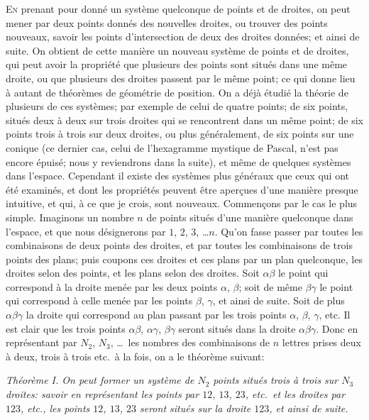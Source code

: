 \documentclass[12pt,a4paper]{article}
\theoremstyle{plain}
\begin{document}
\textsc{En} prenant pour donn\'e un syst\`eme quelconque de points et de droites, on peut mener par deux points donn\'es des nouvelles droites, ou trouver des points nouveaux, savoir les points d'intersection de deux des droites donn\'ees; et ainsi de suite. On obtient de cette mani\`ere un nouveau syst\`eme de points et de droites, qui peut avoir la propri\'et\'e que plusieurs des points sont situ\'es dans une m\^eme droite, ou que plusieurs des droites passent par le m\^eme point; ce qui donne lieu \`a autant de th\'eor\`emes de g\'eom\'etrie de position. On a d\'ej\`a \'etudi\'e la th\'eorie de plusieurs de ces syst\`emes; par exemple de celui de quatre points; de six points, situ\'es deux \`a deux sur trois droites qui se rencontrent dans un m\^eme point; de six points trois \`a trois sur deux droites, ou plus g\'en\'eralement, de six points sur une conique (ce dernier cas, celui de l'hexagramme mystique de Pascal, n'est pas encore \'epuis\'e; nous y reviendrons dans la suite), et m\^eme de quelques syst\`emes dans l'espace. Cependant il existe des syst\`emes plus g\'en\'eraux que ceux qui ont \'et\'e examin\'es, et dont les propri\'et\'es peuvent \^etre aper\c{c}ues d'une mani\`ere presque intuitive, et qui, \`a ce que je crois, sont nouveaux. Commen\c{c}ons par le cas le plus simple. Imaginons un nombre $n$ de points situ\'es d'une mani\`ere quelconque dans l'espace, et que nous d\'esignerons par $1$, $2$, $3$, \ldots $n$. Qu'on fasse passer par toutes les combinaisons de deux points des droites, et par toutes les combinaisons de trois points des plans; puis coupons ces droites et ces plans par un plan quelconque, les droites selon des points, et les plans selon des droites. Soit $\alpha\beta$ le point qui correspond \`a la droite men\'ee par les deux points $\alpha$, $\beta$; soit de m\^eme $\beta\gamma$ le point qui correspond \`a celle men\'ee par les points $\beta$, $\gamma$, et ainsi de suite. Soit de plus $\alpha\beta\gamma$ la droite qui correspond au plan passant par les trois points $\alpha$, $\beta$, $\gamma$, etc. Il est clair que les trois points $\alpha\beta$, $\alpha\gamma$, $\beta\gamma$ seront situ\'es dans la droite $\alpha\beta\gamma$. Donc en repr\'esentant par $N_2$, $N_3$, \ldots\ les nombres des combinaisons de $n$ lettres prises deux \`a deux, trois \`a trois etc.\ \`a la fois, on a le th\'eor\`eme suivant:

\smallskip
\textit{Th\'eor\`eme I. On peut former un syst\`eme de $N_2$ points situ\'es trois \`a trois sur $N_3$ droites: savoir en repr\'esentant les points par $12$, $13$, $23$, etc.\ et les droites par $123$, etc., les points $12$, $13$, $23$ seront situ\'es sur la droite $123$, et ainsi de suite.}
\smallskip
\end{document}
